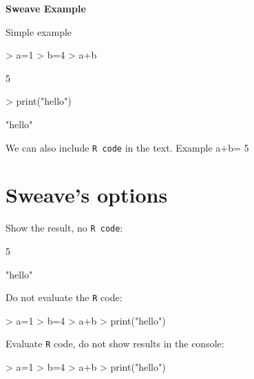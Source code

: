 \documentclass[11pt]{article}
\begin{document}

\begin{center}
{\bf \Large Sweave Example\\}
 \end{center}

\noindent Simple example
 
\begin{Schunk}
\begin{Sinput}
> a=1
> b=4
> a+b
\end{Sinput}
\begin{Soutput}
[1] 5
\end{Soutput}
\begin{Sinput}
> print("hello")
\end{Sinput}
\begin{Soutput}
[1] "hello"
\end{Soutput}
\end{Schunk}

\noindent We can also include {\tt R code} in the text. Example a+b= 5


\section{Sweave's options}

\noindent Show the result, no {\tt R code}:

\begin{Schunk}
\begin{Soutput}
[1] 5
\end{Soutput}
\begin{Soutput}
[1] "hello"
\end{Soutput}
\end{Schunk}

\noindent Do not evaluate the {\tt R} code:

\begin{Schunk}
\begin{Sinput}
> a=1
> b=4
> a+b
> print("hello")
\end{Sinput}
\end{Schunk}


\noindent Evaluate {\tt R} code, do not show results in the console:

\begin{Schunk}
\begin{Sinput}
> a=1
> b=4
> a+b
> print("hello")
\end{Sinput}
\end{Schunk}
\end{document}
